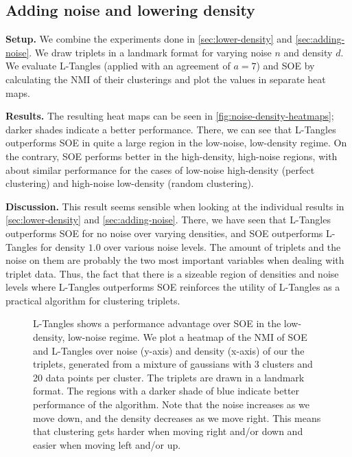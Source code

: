\subsection{Adding noise and lowering density}
\textbf{Setup.}
We combine the experiments done in \autoref{sec:lower-density} and \autoref{sec:adding-noise}. We draw triplets in a landmark format for varying 
noise $n$ and density $d$. We evaluate L-Tangles (applied with an agreement of $a=7$) and SOE by calculating the NMI of their clusterings and plot the values in separate heat maps. 

\textbf{Results.}
The resulting heat maps can be seen in \autoref{fig:noise-density-heatmaps}; darker shades indicate a better performance.
There, we can see that L-Tangles outperforms SOE in quite a large region in the low-noise, low-density regime. 
On the contrary, SOE performs better in the high-density, high-noise regions, with about similar performance
for the cases of low-noise high-density (perfect clustering) and high-noise low-density (random clustering).

\textbf{Discussion.}
This result seems sensible when looking at the individual results in \autoref{sec:lower-density} and \autoref{sec:adding-noise}. There, we have seen that L-Tangles
outperforms SOE for no noise over varying densities, and SOE outperforms L-Tangles for density $1.0$ over various noise levels. The amount of triplets and the noise on them are probably
the two most important variables when dealing with triplet data. Thus, the fact that there is a sizeable region of densities and noise levels where L-Tangles outperforms
SOE reinforces the utility of L-Tangles as a practical algorithm for clustering triplets.

\onecolumn
\begin{figure}[ht]
    \centering
    \caption{
        L-Tangles shows a performance advantage over SOE in the low-density, low-noise regime. 
        We plot a heatmap of the NMI of SOE and L-Tangles over noise (y-axis) and density (x-axis) of our the triplets, 
        generated from a mixture of gaussians with 3 clusters and 20 data points per cluster. The triplets are drawn in a landmark format. 
        The regions with a darker shade of blue indicate better performance of the algorithm. 
        Note that the noise increases as we move down, and the
        density decreases as we move right. This means that clustering gets harder when moving right and/or down and easier when moving left and/or up.
    }
    \label{fig:noise-density-heatmaps}
\end{figure}

